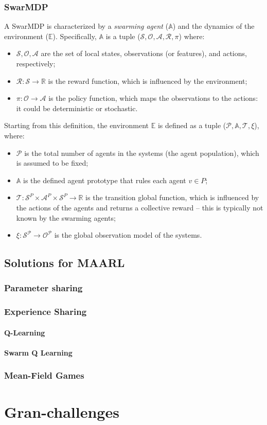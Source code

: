 \subsubsection{SwarMDP}
A SwarMDP is characterized by a \emph{swarming agent} ($\mathbb{A}$) and the dynamics of the environment ($\mathbb{E}$).
Specifically, $\mathbb{A}$ is a tuple ($\mathcal{S}, \mathcal{O}, \mathcal{A}, \mathcal{R}, \pi$) where:
\begin{itemize}
  \item $\mathcal{S, O, A}$ are the set of local states, observations (or features), and actions, respectively;
  \item $\mathcal{R}: \mathcal{S} \rightarrow \mathbb{R}$ is the reward function, which is influenced by the environment;
  \item $\pi: \mathcal{O} \rightarrow \mathcal{A}$ is the policy function, which maps the observations to the actions: it could be deterministic or stochastic.
\end{itemize}
Starting from this definition, the environment $\mathbb{E}$ is defined as a tuple ($\mathcal{P}, \mathbb{A}, \mathcal{T}, \xi$), where:
\begin{itemize}
  \item $\mathcal{P}$ is the total number of agents in the systems (the agent population), which is assumed to be fixed;
  \item $\mathbb{A}$ is the defined agent prototype that rules each agent $v \in P$;
  \item $\mathcal{T}: \mathcal{S}^P \times \mathcal{A}^P \times \mathcal{S}^P \rightarrow \mathbb{R}$ is the transition  global function, which is influenced by the actions of the agents and returns a collective reward -- this is typically not known by the swarming agents;
  \item $\xi: \mathcal{S^P} \rightarrow \mathcal{O^P}$ is the global observation model of the systems.
\end{itemize}

\subsection{Solutions for \ac{MAARL}}

\subsubsection*{Parameter sharing}
\subsubsection*{Experience Sharing}
\paragraph*{Q-Learning}
\paragraph*{Swarm Q Learning}
\subsubsection*{Mean-Field Games}
\section{Gran-challenges}
